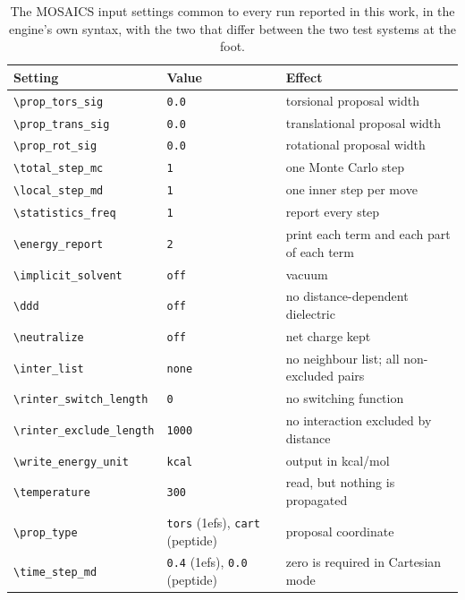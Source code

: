 \begin{table}[h]
\centering
\footnotesize
\caption{The MOSAICS input settings common to every run reported in this work,
in the engine's own syntax, with the two that differ between the two test
systems at the foot.}
\label{tab:si-mosaics}
\begin{tabular}{lll}
\toprule
Setting & Value & Effect \\
\midrule
\texttt{\textbackslash prop\_tors\_sig}   & \texttt{0.0} & torsional proposal width \\
\texttt{\textbackslash prop\_trans\_sig}  & \texttt{0.0} & translational proposal width \\
\texttt{\textbackslash prop\_rot\_sig}    & \texttt{0.0} & rotational proposal width \\
\texttt{\textbackslash total\_step\_mc}   & \texttt{1}   & one Monte Carlo step \\
\texttt{\textbackslash local\_step\_md}   & \texttt{1}   & one inner step per move \\
\texttt{\textbackslash statistics\_freq}  & \texttt{1}   & report every step \\
\texttt{\textbackslash energy\_report}    & \texttt{2}   & print each term and each part of each term \\
\texttt{\textbackslash implicit\_solvent} & \texttt{off} & vacuum \\
\texttt{\textbackslash ddd}               & \texttt{off} & no distance-dependent dielectric \\
\texttt{\textbackslash neutralize}        & \texttt{off} & net charge kept \\
\texttt{\textbackslash inter\_list}       & \texttt{none}& no neighbour list; all non-excluded pairs \\
\texttt{\textbackslash rinter\_switch\_length}  & \texttt{0}    & no switching function \\
\texttt{\textbackslash rinter\_exclude\_length} & \texttt{1000} & no interaction excluded by distance \\
\texttt{\textbackslash write\_energy\_unit}     & \texttt{kcal} & output in kcal/mol \\
\texttt{\textbackslash temperature}             & \texttt{300}  & read, but nothing is propagated \\
\midrule
\texttt{\textbackslash prop\_type}    & \texttt{tors} (1efs), \texttt{cart} (peptide) & proposal coordinate \\
\texttt{\textbackslash time\_step\_md}& \texttt{0.4} (1efs), \texttt{0.0} (peptide)   & zero is required in Cartesian mode \\
\bottomrule
\end{tabular}
\end{table}

